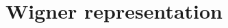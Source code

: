 \chapter{Wigner representation}
\label{cha:wigner}

\begin{comment}
\subsection{Wigner representation}

We use a multimode Wigner function representation~\cite{Gardiner2004} of the density operator,
with operator correspondences being:
\begin{align*}
\hat{a}_{ik} \rho = \left( \alpha_{ik} + \frac{1}{2} \frac{\partial}{\partial \alpha_{ik}^*} \right) W, & &
\hat{a}_{ik}^\dagger \rho = \left( \alpha_{ik}^* - \frac{1}{2} \frac{\partial}{\partial \alpha_{ik}} \right) W, \\
\rho \hat{a}_{ik} = \left( \alpha_{ik} - \frac{1}{2} \frac{\partial}{\partial \alpha_{ik}^*} \right) W, & &
\rho \hat{a}_{ik}^\dagger = \left( \alpha_{ik}^* + \frac{1}{2} \frac{\partial}{\partial \alpha_{ik}} \right) W.
\end{align*}

Using these, we can transform the noninteracting term:
\begin{align*}
\begin{split}
\sum\limits^2_{i=1}\int\limits_V d\xvec \, \Psiop_i^\dagger(\xvec) \hat{K} \Psiop_i(\xvec) = &
\sum\limits_{i=1}^2 \sum\limits_k \hbar \omega_{k} \hat{a}_{ik}^\dagger \hat{a}_{ik} \\
\rightarrow {} & \sum\limits_{i=1}^2 \sum\limits_{k \in L} \hbar \omega_{k} \hat{a}_{ik}^\dagger \hat{a}_{ik} \\
\rightarrow {} & - \sum\limits_{i=1}^2 \sum\limits_{k \in L} \hbar \omega_k \left(
	\frac{\partial}{\partial \alpha_{ik}} \alpha_{ik} - \frac{\partial}{\partial \alpha_{ik}^*} \alpha_{ik}^*
\right) W \\
= {} & - \sum\limits_{i=1}^2 \int\limits_V d\xvec \left(
	\frac{\delta}{\delta \psi_{iP}} \hat{K} \psi_{iP} - \frac{\delta}{\delta \psi_{iP}^*} \hat{K} \psi_{iP}^*
\right)
\end{split}
\end{align*}


\end{comment}
